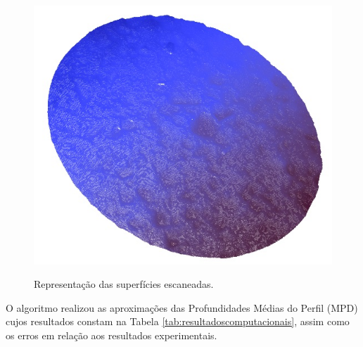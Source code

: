 \begin{figure}[!ht]
{\includegraphics[scale=0.50]{figures/cp3.jpg}}
\caption{Representação das superfícies escaneadas.} 
\label{Fig:cps}
\end{figure}

O algoritmo realizou as aproximações das Profundidades Médias do Perfil (MPD) cujos resultados constam na Tabela \ref{tab:resultadoscomputacionais}, assim como os erros em relação aos resultados experimentais. 

